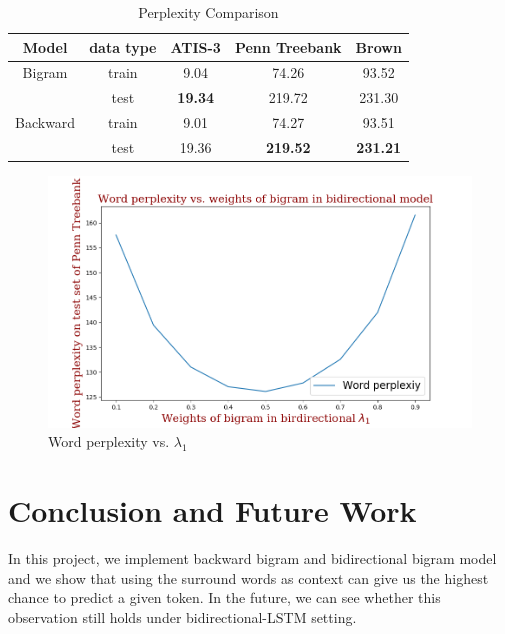 \documentclass[11pt,a4paper]{article}
\begin{document}
\begin{table}
\captionsetup{justification=centering}
\caption{Perplexity Comparison}
\label{tab:p}
\begin{tabular}{c|c|*3{c}}
\hline
Model & data type & ATIS-3 & Penn Treebank & Brown \\ \hline
Bigram & train & 9.04 & 74.26 & 93.52  \\ 
& test & \textbf{19.34}  & 219.72  & 231.30 \\ \hline
Backward & train & 9.01  & 74.27  & 93.51  \\ 
& test & 19.36  & \textbf{219.52}  & \textbf{231.21} \\ \hline
\end{tabular}
\end{table}

\begin{figure}
\includegraphics[scale=0.4]{figure_1.png}
\caption{Word perplexity vs. $\lambda_1$}
\label{fig:1}
\end{figure}


\section{Conclusion and Future Work}

In this project, we implement backward bigram and bidirectional bigram model
and we show that using the surround words as context can give us the highest chance
to predict a given token. In the future, we can see whether this observation still
holds under bidirectional-LSTM setting.



\end{document}
